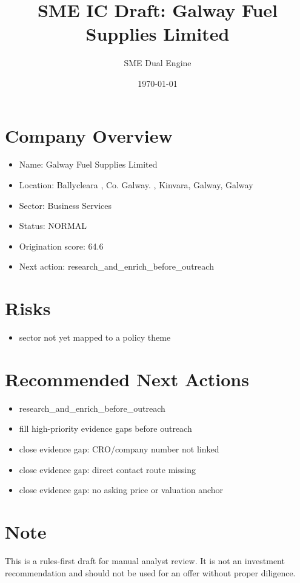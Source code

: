\documentclass[11pt,a4paper]{article}
\title{SME IC Draft: Galway Fuel Supplies Limited}
\author{SME Dual Engine}
\date{\today}
\begin{document}
\maketitle
\section*{Company Overview}
\begin{itemize}[leftmargin=1.4em]
\item Name: Galway Fuel Supplies Limited
\item Location: Ballycleara , Co. Galway. , Kinvara, Galway, Galway
\item Sector: Business Services
\item Status: NORMAL
\item Origination score: 64.6
\item Next action: research\_and\_enrich\_before\_outreach
\end{itemize}
\section*{Risks}
\begin{itemize}[leftmargin=1.4em]
\item sector not yet mapped to a policy theme
\end{itemize}
\section*{Recommended Next Actions}
\begin{itemize}[leftmargin=1.4em]
\item research\_and\_enrich\_before\_outreach
\item fill high-priority evidence gaps before outreach
\item close evidence gap: CRO/company number not linked
\item close evidence gap: direct contact route missing
\item close evidence gap: no asking price or valuation anchor
\end{itemize}
\section*{Note}
This is a rules-first draft for manual analyst review. It is not an investment
recommendation and should not be used for an offer without proper diligence.
\end{document}
